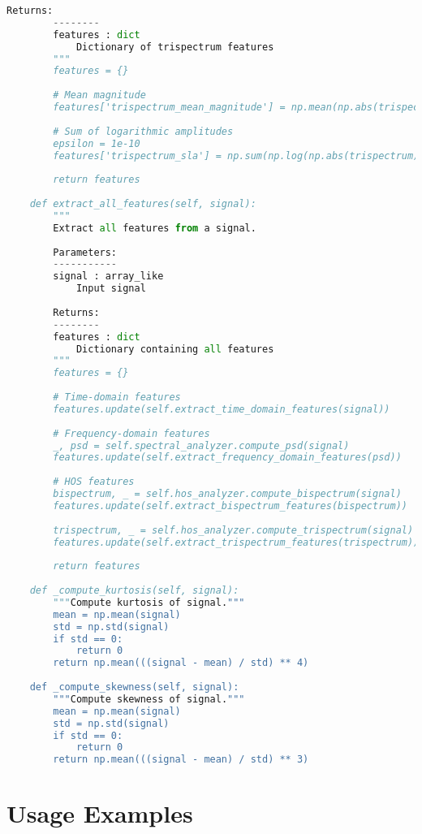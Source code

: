 \begin{lstlisting}[language=Python, caption=FeatureExtractor class for comprehensive feature extraction]
        Returns:
        --------
        features : dict
            Dictionary of trispectrum features
        """
        features = {}
        
        # Mean magnitude
        features['trispectrum_mean_magnitude'] = np.mean(np.abs(trispectrum))
        
        # Sum of logarithmic amplitudes
        epsilon = 1e-10
        features['trispectrum_sla'] = np.sum(np.log(np.abs(trispectrum) + epsilon))
        
        return features
    
    def extract_all_features(self, signal):
        """
        Extract all features from a signal.
        
        Parameters:
        -----------
        signal : array_like
            Input signal
            
        Returns:
        --------
        features : dict
            Dictionary containing all features
        """
        features = {}
        
        # Time-domain features
        features.update(self.extract_time_domain_features(signal))
        
        # Frequency-domain features
        _, psd = self.spectral_analyzer.compute_psd(signal)
        features.update(self.extract_frequency_domain_features(psd))
        
        # HOS features
        bispectrum, _ = self.hos_analyzer.compute_bispectrum(signal)
        features.update(self.extract_bispectrum_features(bispectrum))
        
        trispectrum, _ = self.hos_analyzer.compute_trispectrum(signal)
        features.update(self.extract_trispectrum_features(trispectrum))
        
        return features
    
    def _compute_kurtosis(self, signal):
        """Compute kurtosis of signal."""
        mean = np.mean(signal)
        std = np.std(signal)
        if std == 0:
            return 0
        return np.mean(((signal - mean) / std) ** 4)
    
    def _compute_skewness(self, signal):
        """Compute skewness of signal."""
        mean = np.mean(signal)
        std = np.std(signal)
        if std == 0:
            return 0
        return np.mean(((signal - mean) / std) ** 3)
\end{lstlisting}

\section{Usage Examples}

